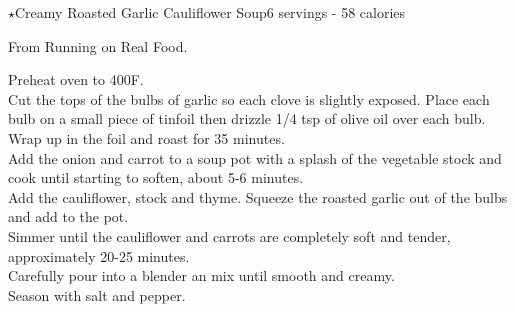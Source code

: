\begin{recipe}{$\star$Creamy Roasted Garlic Cauliflower Soup}{6 servings - 58 calories}{}

\freeform From Running on Real Food.


Preheat oven to 400\degree F.\\

Cut the tops of the bulbs of garlic so each clove is slightly exposed. Place each bulb on a small piece of tinfoil then drizzle 1/4 tsp of olive oil over each bulb. Wrap up in the foil and roast for 35 minutes.\\

Add the onion and carrot to a soup pot with a splash of the vegetable stock and cook until starting to soften, about 5-6 minutes.\\

Add the cauliflower, stock and thyme. Squeeze the roasted garlic out of the bulbs and add to the pot.\\

Simmer until the cauliflower and carrots are completely soft and tender, approximately 20-25 minutes.\\

Carefully pour into a blender an mix until smooth and creamy.\\

Season with salt and pepper.

\end{recipe}